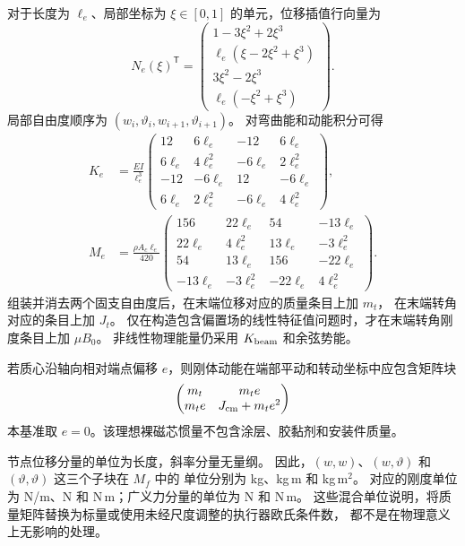 对于长度为 $\ell_e$、局部坐标为 $\xi\in[0,1]$ 的单元，位移插值行向量为
\begin{equation}
 N_e(\xi)^{\mathsf T}=
 \begin{pmatrix}
 1-3\xi^2+2\xi^3\\
 \ell_e(\xi-2\xi^2+\xi^3)\\
 3\xi^2-2\xi^3\\
 \ell_e(-\xi^2+\xi^3)
 \end{pmatrix}.
 \label{sm:hermite-shape}
\end{equation}
局部自由度顺序为 $(w_i,\vartheta_i,w_{i+1},\vartheta_{i+1})$。
对弯曲能和动能积分可得
\begin{align}
 K_e&=\frac{EI}{\ell_e^3}
 \begin{pmatrix}
 12&6\ell_e&-12&6\ell_e\\
 6\ell_e&4\ell_e^2&-6\ell_e&2\ell_e^2\\
 -12&-6\ell_e&12&-6\ell_e\\
 6\ell_e&2\ell_e^2&-6\ell_e&4\ell_e^2
 \end{pmatrix},\nonumber\\
 M_e&=\frac{\rho A_c\ell_e}{420}
 \begin{pmatrix}
 156&22\ell_e&54&-13\ell_e\\
 22\ell_e&4\ell_e^2&13\ell_e&-3\ell_e^2\\
 54&13\ell_e&156&-22\ell_e\\
 -13\ell_e&-3\ell_e^2&-22\ell_e&4\ell_e^2
 \end{pmatrix}.
 \label{sm:element-matrices}
\end{align}
组装并消去两个固支自由度后，在末端位移对应的质量条目上加 $m_t$，
在末端转角对应的条目上加 $J_t$。
仅在构造包含偏置场的线性特征值问题时，才在末端转角刚度条目上加 $\mu B_0$。
非线性物理能量仍采用 $K_{\rm beam}$ 和余弦势能。

若质心沿轴向相对端点偏移 $e$，则刚体动能在端部平动和转动坐标中应包含矩阵块
\begin{equation}
 \begin{pmatrix}m_t&m_te\\m_te&J_{\rm cm}+m_te^2\end{pmatrix}
 \label{sm:offset-tip}
\end{equation}
本基准取 $e=0$。该理想裸磁芯惯量不包含涂层、胶黏剂和安装件质量。

节点位移分量的单位为长度，斜率分量无量纲。
因此，$(w,w)$、$(w,\vartheta)$ 和 $(\vartheta,\vartheta)$ 这三个子块在 $M_f$ 中的
单位分别为 kg、kg\,m 和 kg\,m$^2$。
对应的刚度单位为 N/m、N 和 N\,m；广义力分量的单位为 N 和 N\,m。
这些混合单位说明，将质量矩阵替换为标量或使用未经尺度调整的执行器欧氏条件数，
都不是在物理意义上无影响的处理。

